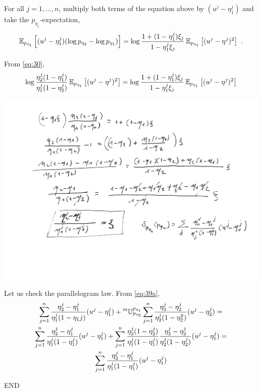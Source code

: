 \documentclass[12pt,a4paper]{amsart}
\begin{document}
 For all $j = 1,\dots,n$, multiply both terms of the equation above by $(u^j - \eta_1^j)$ and take the $p_{\eta_1}$-expectation,
 \begin{equation}
   \label{eq:43}
   \operatorname{\mathbb E}_{p_{\eta_1}}\left[(u^j-\eta^j_1)(\log p_{\eta_2} - \log p_{\eta_1})\right] = \log \frac{1 + (1-\eta^j_1) \xi_j}{1 -\eta^j_1\xi_j} \operatorname{\mathbb E}_{p_{\eta_1}}\left[(u^j - \eta^j)^2\right] \ .
 \end{equation}
 
 From \cref{eq:30},
 \begin{equation}
   \label{eq:47}
   \log \frac {\eta^j_2(1 - \eta^j_1)}{\eta^j_1 (1- \eta^j_2)} \operatorname{\mathbb E}_{p_{\eta_1}}\left[(u^j - \eta^j)^2\right] = \log \frac{1 + (1-\eta^j_1) \xi_j}{1 -\eta^j_1\xi_j} \operatorname{\mathbb E}_{p_{\eta_1}}\left[(u^j - \eta^j)^2\right]
 \end{equation}

 \includegraphics[width=\textwidth]{scans/scan-1.pdf}

 Let us check the parallelogram law. From \cref{eq:39a},
 \begin{multline}
   \label{eq:48}
   \sum_{j=1}^n \frac{\eta^j_2-\eta_1^j}{\eta_1^j(1-\eta_1j)}(u^j-\eta_1^j) + \prescript{\text{m}}{} {\mathbb U} _ {p_{\eta_2}} ^ {p_{\eta_1}} \sum_{j=1}^n \frac{\eta^j_3-\eta_2^j}{\eta_2^j(1-\eta_2^y)}(u^j-\eta_2^j) = \\
   \sum_{j=1}^n \frac{\eta^j_2-\eta_1^j}{\eta_1^j(1-\eta_1^j)}(u^j-\eta_1^j) + \sum_{j=1}^n  \frac{\eta^j_2(1-\eta^j_2)} {\eta^j_1(1-\eta^j_1)} \frac{\eta^j_3-\eta_2^j}{\eta_2^j(1-\eta_2^j)}(u^j-\eta_1^j) = \\
   \sum_{j=1}^n \frac{\eta^j_3-\eta_1^j}{\eta_1^j(1-\eta_1^j)}(u^j-\eta_1^j) 
 \end{multline}


 END


% 


\end{document}
